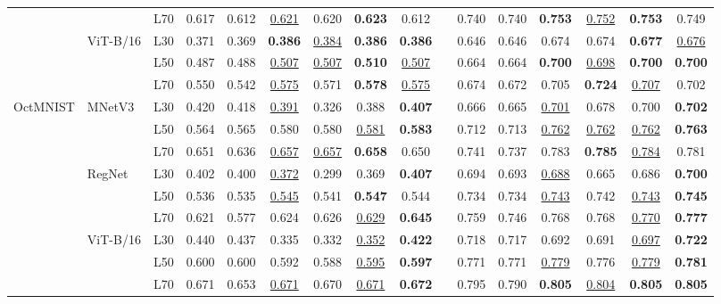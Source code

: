 \begin{table}[t]
{\begin{tabular}{lll cccccc |c cccccc}
 &  & L70 & 0.617 & 0.612 & \underline{0.621} & 0.620 & \textbf{0.623} & 0.612 & & 0.740 & 0.740 & \textbf{0.753} & \underline{0.752} & \textbf{0.753} & 0.749 \\
\cmidrule(lr){2-16}
 & \multirow{3}{*}{ViT-B/16} & L30 & 0.371 & 0.369 & \textbf{0.386} & \underline{0.384} & \textbf{0.386} & \textbf{0.386} & & 0.646 & 0.646 & 0.674 & 0.674 & \textbf{0.677} & \underline{0.676} \\
 &  & L50 & 0.487 & 0.488 & \underline{0.507} & \underline{0.507} & \textbf{0.510} & \underline{0.507} & & 0.664 & 0.664 & \textbf{0.700} & \underline{0.698} & \textbf{0.700} & \textbf{0.700} \\
 &  & L70 & 0.550 & 0.542 & \underline{0.575} & 0.571 & \textbf{0.578} & \underline{0.575} & & 0.674 & 0.672 & 0.705 & \textbf{0.724} & \underline{0.707} & 0.702 \\
\midrule
\multirow{9}{*}{OctMNIST} & \multirow{3}{*}{MNetV3} & L30 & 0.420 & 0.418 & \underline{0.391} & 0.326 & 0.388 & \textbf{0.407} & & 0.666 & 0.665 & \underline{0.701} & 0.678 & 0.700 & \textbf{0.702} \\
 &  & L50 & 0.564 & 0.565 & 0.580 & 0.580 & \underline{0.581} & \textbf{0.583} & & 0.712 & 0.713 & \underline{0.762} & \underline{0.762} & \underline{0.762} & \textbf{0.763} \\
 &  & L70 & 0.651 & 0.636 & \underline{0.657} & \underline{0.657} & \textbf{0.658} & 0.650 & & 0.741 & 0.737 & 0.783 & \textbf{0.785} & \underline{0.784} & 0.781 \\
\cmidrule(lr){2-16}
 & \multirow{3}{*}{RegNet} & L30 & 0.402 & 0.400 & \underline{0.372} & 0.299 & 0.369 & \textbf{0.407} & & 0.694 & 0.693 & \underline{0.688} & 0.665 & 0.686 & \textbf{0.700} \\
 &  & L50 & 0.536 & 0.535 & \underline{0.545} & 0.541 & \textbf{0.547} & 0.544 & & 0.734 & 0.734 & \underline{0.743} & 0.742 & \underline{0.743} & \textbf{0.745} \\
 &  & L70 & 0.621 & 0.577 & 0.624 & 0.626 & \underline{0.629} & \textbf{0.645} & & 0.759 & 0.746 & 0.768 & 0.768 & \underline{0.770} & \textbf{0.777} \\
\cmidrule(lr){2-16}
 & \multirow{3}{*}{ViT-B/16} & L30 & 0.440 & 0.437 & 0.335 & 0.332 & \underline{0.352} & \textbf{0.422} & & 0.718 & 0.717 & 0.692 & 0.691 & \underline{0.697} & \textbf{0.722} \\
 &  & L50 & 0.600 & 0.600 & 0.592 & 0.588 & \underline{0.595} & \textbf{0.597} & & 0.771 & 0.771 & \underline{0.779} & 0.776 & \underline{0.779} & \textbf{0.781} \\
 &  & L70 & 0.671 & 0.653 & \underline{0.671} & 0.670 & \underline{0.671} & \textbf{0.672} & & 0.795 & 0.790 & \textbf{0.805} & \underline{0.804} & \textbf{0.805} & \textbf{0.805} \\
\bottomrule
\end{tabular}%
} %
\end{table}
